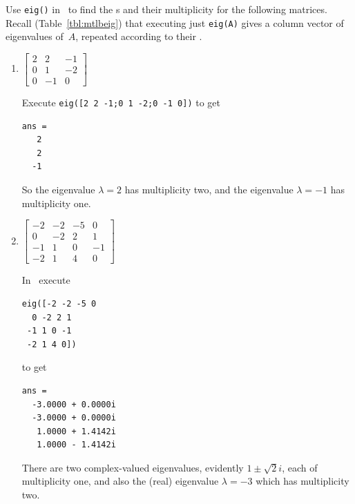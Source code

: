 \begin{example} \label{eg:multeval}
Use \verb|eig()| in \script\  to find the s and their multiplicity for the following matrices.
Recall (Table~\ref{tbl:mtlbeig}) that executing just \verb|eig(A)| gives a column vector of eigenvalues of~\(A\), repeated according to their . 
\begin{enumerate}
\item \(\begin{bmatrix}2&2&-1
\\0&1&-2
\\0&-1&0\end{bmatrix}\)
\begin{solution} 
Execute \verb|eig([2 2 -1;0 1 -2;0 -1 0])| to get
\setbox\ajrqrbox\hbox{}%
\marginpar{\usebox{\ajrqrbox}}%
\begin{verbatim}
ans =
   2
   2
  -1
\end{verbatim}
So the eigenvalue \(\lambda=2\) has multiplicity two, and the eigenvalue \(\lambda=-1\) has multiplicity one.
\end{solution}

\item \(\begin{bmatrix}-2&-2&-5&0
\\0&-2&2&1
\\-1&1&0&-1
\\-2&1&4&0\end{bmatrix}\)
\begin{solution} 
In \script\ execute
\begin{verbatim}
eig([-2 -2 -5 0
  0 -2 2 1
 -1 1 0 -1
 -2 1 4 0])
\end{verbatim}
\setbox\ajrqrbox\hbox{}%
\marginpar{\usebox{\ajrqrbox}}%
to get
\begin{verbatim}
ans =
  -3.0000 + 0.0000i
  -3.0000 + 0.0000i
   1.0000 + 1.4142i
   1.0000 - 1.4142i
\end{verbatim}
There are two complex-valued eigenvalues, evidently \(1\pm\sqrt2i\), each of multiplicity one, and also the (real) eigenvalue \(\lambda=-3\) which has multiplicity two.
\end{solution}


\end{enumerate}
\end{example}
